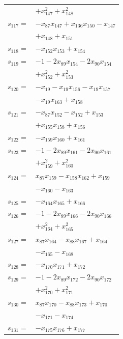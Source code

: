 \begin{longtable}{@{}r@{\;}l@{}}
 & \(\displaystyle +x_{147}^{2} +x_{148}^{2}\) \\[3pt]
\(s_{117}=\) & \(\displaystyle -x_{87}x_{147} +x_{136}x_{150} -x_{147}\) \\
 & \(\displaystyle +x_{148} +x_{151}\) \\[3pt]
\(s_{118}=\) & \(\displaystyle -x_{152}x_{153} +x_{154}\) \\[3pt]
\(s_{119}=\) & \(\displaystyle -1 -2x_{89}x_{154} -2x_{90}x_{154}\) \\
 & \(\displaystyle +x_{152}^{2} +x_{153}^{2}\) \\[3pt]
\(s_{120}=\) & \(\displaystyle -x_{19} -x_{19}x_{156} -x_{19}x_{157}\) \\
 & \(\displaystyle -x_{19}x_{163} +x_{158}\) \\[3pt]
\(s_{121}=\) & \(\displaystyle -x_{87}x_{152} -x_{152} +x_{153}\) \\
 & \(\displaystyle +x_{155}x_{158} +x_{156}\) \\[3pt]
\(s_{122}=\) & \(\displaystyle -x_{159}x_{160} +x_{161}\) \\[3pt]
\(s_{123}=\) & \(\displaystyle -1 -2x_{89}x_{161} -2x_{90}x_{161}\) \\
 & \(\displaystyle +x_{159}^{2} +x_{160}^{2}\) \\[3pt]
\(s_{124}=\) & \(\displaystyle x_{87}x_{159} -x_{158}x_{162} +x_{159}\) \\
 & \(\displaystyle -x_{160} -x_{163}\) \\[3pt]
\(s_{125}=\) & \(\displaystyle -x_{164}x_{165} +x_{166}\) \\[3pt]
\(s_{126}=\) & \(\displaystyle -1 -2x_{89}x_{166} -2x_{90}x_{166}\) \\
 & \(\displaystyle +x_{164}^{2} +x_{165}^{2}\) \\[3pt]
\(s_{127}=\) & \(\displaystyle x_{87}x_{164} -x_{88}x_{167} +x_{164}\) \\
 & \(\displaystyle -x_{165} -x_{168}\) \\[3pt]
\(s_{128}=\) & \(\displaystyle -x_{170}x_{171} +x_{172}\) \\[3pt]
\(s_{129}=\) & \(\displaystyle -1 -2x_{89}x_{172} -2x_{90}x_{172}\) \\
 & \(\displaystyle +x_{170}^{2} +x_{171}^{2}\) \\[3pt]
\(s_{130}=\) & \(\displaystyle x_{87}x_{170} -x_{88}x_{173} +x_{170}\) \\
 & \(\displaystyle -x_{171} -x_{174}\) \\[3pt]
\(s_{131}=\) & \(\displaystyle -x_{175}x_{176} +x_{177}\) \\[3pt]

\end{longtable}
